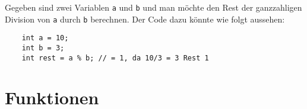 \documentclass[11pt]{article}
\begin{document}
\begin{bsp}
  Gegeben sind zwei Variablen \texttt{a} und \texttt{b} und man möchte den Rest der ganzzahligen Division von \texttt{a}
  durch \texttt{b} berechnen. Der Code dazu könnte wie folgt aussehen:
  \begin{verbatim}
    int a = 10;
    int b = 3;
    int rest = a % b; // = 1, da 10/3 = 3 Rest 1
  \end{verbatim}

\end{bsp}

\section{Funktionen}{\label{sec:funktionen}}
\end{document}
